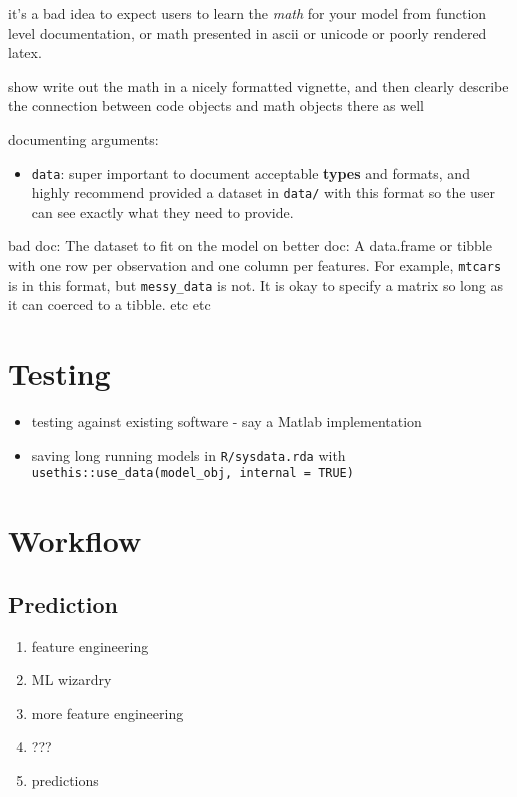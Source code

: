 \documentclass[]{book}
\providecommand{\tightlist}{%
  \setlength{\itemsep}{0pt}\setlength{\parskip}{0pt}}
\theoremstyle{definition}
\theoremstyle{definition}
\theoremstyle{definition}
\theoremstyle{remark}
\begin{document}
it's a bad idea to expect users to learn the \emph{math} for your model
from function level documentation, or math presented in ascii or unicode
or poorly rendered latex.

show write out the math in a nicely formatted vignette, and then clearly
describe the connection between code objects and math objects there as
well

documenting arguments:

\begin{itemize}
\tightlist
\item
  \texttt{data}: super important to document acceptable \textbf{types}
  and formats, and highly recommend provided a dataset in \texttt{data/}
  with this format so the user can see exactly what they need to
  provide.
\end{itemize}

bad doc: The dataset to fit on the model on better doc: A data.frame or
tibble with one row per observation and one column per features. For
example, \texttt{mtcars} is in this format, but \texttt{messy\_data} is
not. It is okay to specify a matrix so long as it can coerced to a
tibble. etc etc

\chapter{Testing}\label{testing}

\begin{itemize}
\tightlist
\item
  testing against existing software - say a Matlab implementation
\item
  saving long running models in \texttt{R/sysdata.rda} with
  \texttt{usethis::use\_data(model\_obj,\ internal\ =\ TRUE)}
\end{itemize}

\chapter{Workflow}\label{workflow}

\section{Prediction}\label{prediction}

\begin{enumerate}
\def\labelenumi{\arabic{enumi}.}
\tightlist
\item
  feature engineering
\item
  ML wizardry
\item
  more feature engineering
\item
  ???
\item
  predictions
\end{enumerate}
\end{document}
